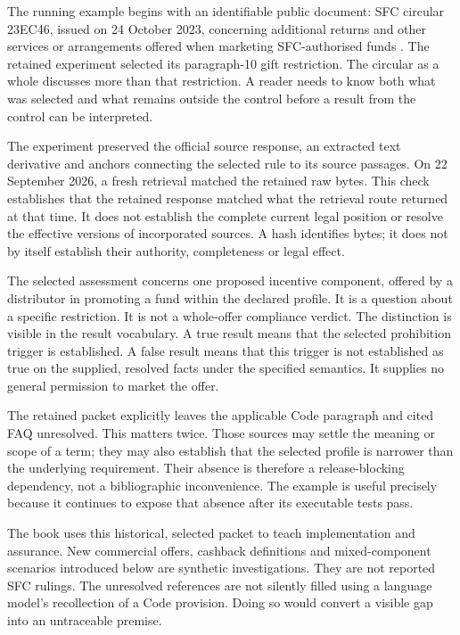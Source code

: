 \documentclass[12pt,a4paper,oneside,openany]{book}
\begin{document}
\label{sec:circular-packet}
The running example begins with an identifiable public document: SFC circular
23EC46, issued on 24 October 2023, concerning additional returns and other
services or arrangements offered when marketing SFC-authorised funds
\citep{sfcmarketing}. The retained experiment selected its paragraph-10 gift
restriction. The circular as a whole discusses more than that restriction. A
reader needs to know both what was selected and what remains outside the control
before a result from the control can be interpreted.

The experiment preserved the official source response, an extracted text
derivative and anchors connecting the selected rule to its source passages.
On 22 September 2026, a fresh retrieval matched the retained raw bytes. This
check establishes that the retained response matched what the retrieval route
returned at that time. It does not establish the complete current legal position
or resolve the effective versions of incorporated sources. A hash identifies
bytes; it does not by itself establish their authority, completeness or legal
effect.

The selected assessment concerns one proposed incentive component, offered by a
distributor in promoting a fund within the declared profile. It is a question
about a specific restriction. It is not a whole-offer compliance verdict. The
distinction is visible in the result vocabulary. A true result means that the
selected prohibition trigger is established. A false result means that this
trigger is not established as true on the supplied, resolved facts under the
specified semantics. It supplies no general permission to market the offer.

The retained packet explicitly leaves the applicable Code paragraph and cited
FAQ unresolved. This matters twice. Those sources may settle the meaning or
scope of a term; they may also establish that the selected profile is narrower
than the underlying requirement. Their absence is therefore a release-blocking
dependency, not a bibliographic inconvenience. The example is useful precisely
because it continues to expose that absence after its executable tests pass.

The book uses this historical, selected packet to teach implementation and
assurance. New commercial offers, cashback definitions and mixed-component
scenarios introduced below are synthetic investigations. They are not reported
SFC rulings. The unresolved references are not silently filled using a language
model's recollection of a Code provision. Doing so would convert a visible gap
into an untraceable premise.
\end{document}
